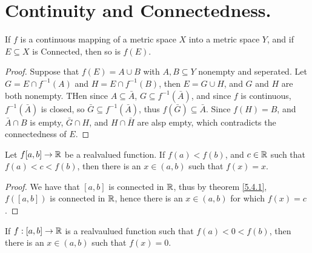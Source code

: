 
\section{Continuity and Connectedness.}

\begin{theorem}\label{5.4.1}
    If $f$ is a continuous mapping of a metric space  $X$ into a metric space  $Y$, and
    if  $E \subseteq X$ is Connected, then so is  $f(E)$.
\end{theorem}
\begin{proof}
    Suppose that $f(E)=A \cup B$ with  $A,B \subseteq Y$ nonempty and seperated. Let
    $G=E \cap f^{-1}(A)$ and  $H=E \cap f^{-1}(B)$, then  $E=G \cup H$, and  $G$ and  $H$ are both
    nonempty. THen since  $A \subseteq \bar{A}$,  $G \subseteq f^{-1}(\bar{A})$, and since  $f$ is continuous,
    $f^{-1}(\bar{A})$ is closed, so  $\bar{G} \subseteq f^{-1}(\bar{A})$, thus  $f(\bar{G}) \subseteq \bar{A}$.
    Since  $f(H)=B$, and  $\bar{A} \cap B$ is empty,  $\bar{G} \cap H$, and $H \cap \bar{H}$ are
    alsp empty, which contradicts the connectedness of $E$.
\end{proof}

\begin{theorem}\label{5.4.2}
    Let $f[a,b] \rightarrow \mathbb{R}$ be a realvalued function. If  $f(a)<f(b)$, and  $c \in \mathbb{R}$ such that
    $f(a)<c<f(b)$, then there is an  $x \in (a,b)$ such that $f(x)=x$.
\end{theorem}
\begin{proof}
    We have that $[a,b]$ is connected in  $\mathbb{R}$, thus by theorem \ref{5.4.1}, $f([a,b])$ is
    connected in $\mathbb{R}$, hence there is an  $x \in  (a,b)$ for which $f(x)=c$.
\end{proof}

\begin{corollary}
    If $f:[a,b] \rightarrow \mathbb{R}$ is a realvaulued function such that $f(a)<0<f(b)$, then
    there is an $x \in (a,b)$ such that $f(x)=0$.
\end{corollary}
